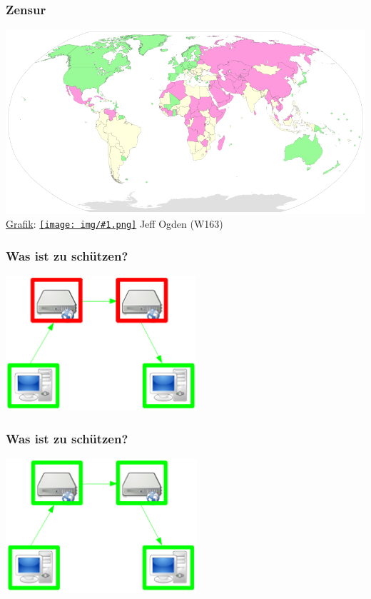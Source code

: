 \documentclass[12pt]{beamer}
\newcommand{\cc}[1]{\texttt{[image: img/\#1.png]}\hspace{1mm}}
\begin{document}
\begin{frame}
    \frametitle{Zensur}
    \includegraphics[height=0.7\textheight]{img/zensur.png}
    \\{\small \href{http://upload.wikimedia.org/wikipedia/commons/5/51/RWB-PressFreedomIndex2013-WorldMap.svg}{Grafik}: \href{http://creativecommons.org/licenses/by-sa/3.0/deed.en}{\cc{by-sa}} Jeff Ogden (W163)}
\end{frame}

\begin{frame}
    \frametitle{Was ist zu schützen?}
    \begin{center}
      \includegraphics[height=5cm]{img/fed-clients-comm.png}
    \end{center}
\end{frame}

\begin{frame}
    \frametitle{Was ist zu schützen?}
    \begin{center}
      \includegraphics[height=5cm]{img/fed-all.png}
    \end{center}
\end{frame}
\end{document}
